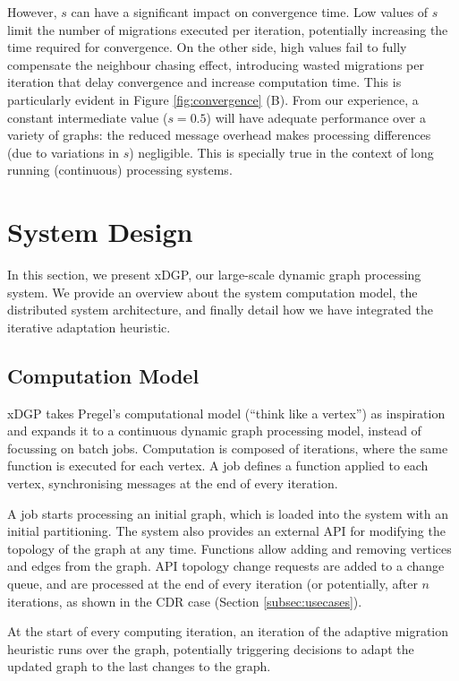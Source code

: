 \documentclass{sig-alternate-10pt}
\begin{document}
However, $s$ can have a significant impact on convergence time. Low values of $s$ limit the number of migrations executed per iteration, potentially increasing the time required for convergence. On the other side, high values fail to fully compensate the neighbour chasing effect, introducing wasted migrations per iteration that delay convergence and increase computation time. This is particularly evident in Figure \ref{fig:convergence} (B). From our experience, a constant intermediate value ($s = 0.5$) will have adequate performance over a variety of graphs: the reduced message overhead makes processing differences (due to variations in $s$) negligible. This is specially true in the context of long running (continuous) processing systems.


\section{System Design}
\label{sec:lsid}

In this section, we present xDGP, our large-scale dynamic graph processing system. We provide an overview about the system computation model, the distributed system architecture, and finally detail how we have integrated the iterative adaptation heuristic.

\subsection{Computation Model} 

xDGP takes Pregel's computational model (``think like a vertex'') as inspiration and expands it to a continuous dynamic graph processing model, instead of focussing on batch jobs. Computation is composed of iterations, where the same function is executed for each vertex. A job defines a function applied to each vertex, synchronising messages at the end of every iteration. 

A job starts processing an initial graph, which is loaded into the system with an initial partitioning. The system also provides an external API for modifying the topology of the graph at any time. Functions allow adding and removing vertices and edges from the graph. API topology change requests are added to a change queue, and are processed at the end of every iteration (or potentially, after $n$ iterations, as shown in the CDR case (Section \ref{subsec:usecases}). 

At the start of every computing iteration, an iteration of the  adaptive migration heuristic runs over the graph, potentially triggering decisions to adapt the updated graph to the last changes to the graph. 
\end{document}
